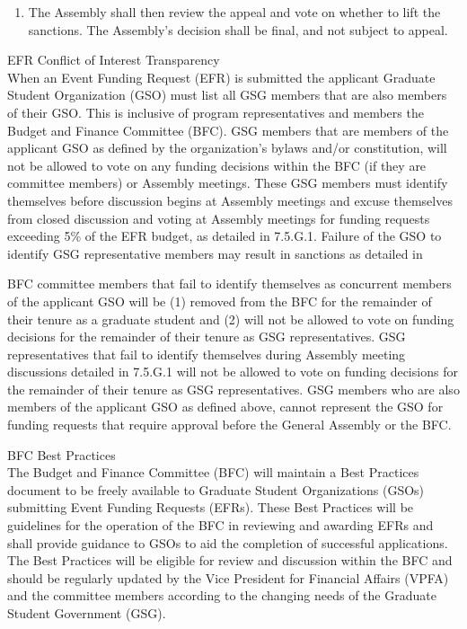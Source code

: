 \begin{bylaws-number}
\begin{bylaws-number}
\begin{enumerate}[i]
      \item The Assembly shall then review the appeal and vote on whether to lift the sanctions. The Assembly’s decision shall be final, and not subject to appeal.
    \end{enumerate}
  \end{bylaws-number}
  \item EFR Conflict of Interest Transparency \hfill \\
  When an Event Funding Request (EFR) is submitted the applicant Graduate Student Organization (GSO) must list all GSG members that are also members of their GSO. This is inclusive of program representatives and members the Budget and Finance Committee (BFC). GSG members that are members of the applicant GSO as defined by the organization’s bylaws and/or constitution, will not be allowed to vote on any funding decisions within the BFC (if they are committee members) or Assembly meetings. These GSG members must identify themselves before discussion begins at Assembly meetings and excuse themselves from closed discussion and voting at Assembly meetings for funding requests exceeding 5\% of the EFR budget, as detailed in 7.5.G.1. Failure of the GSO to identify GSG representative members may result in sanctions as detailed in
  \item BFC committee members that fail to identify themselves as concurrent members of the applicant GSO will be (1) removed from the BFC for the remainder of their tenure as a graduate student and (2) will not be allowed to vote on funding decisions for the remainder of their tenure as GSG representatives. GSG representatives that fail to identify themselves during Assembly meeting discussions detailed in 7.5.G.1 will not be allowed to vote on funding decisions for the remainder of their tenure as GSG representatives. GSG members who are also members of the applicant GSO as defined above, cannot represent the GSO for funding requests that require approval before the General Assembly or the BFC.
  \item BFC Best Practices \hfill \\
  The Budget and Finance Committee (BFC) will maintain a Best Practices document to be freely available to Graduate Student Organizations (GSOs) submitting Event Funding Requests (EFRs). These Best Practices will be guidelines for the operation of the BFC in reviewing and awarding EFRs and shall provide guidance to GSOs to aid the completion of successful applications. The Best Practices will be eligible for review and discussion within the BFC and should be regularly updated by the Vice President for Financial Affairs (VPFA) and the committee members according to the changing needs of the Graduate Student Government (GSG).
\end{bylaws-number}
